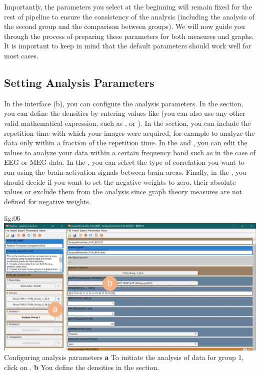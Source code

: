 \documentclass[justified]{tufte-handout}
\begin{document}
Importantly, the parameters you select at the beginning will remain fixed for the rest of pipeline to ensure the consistency of the analysis (including the analysis of the second group and the comparison between groups). We will now guide you through the process of preparing these parameters for both measures and graphs. It is important to keep in mind that the default parameters should work well for most cases.

\subsection{Setting Analysis Parameters}

In the  interface (b), you can configure the analysis parameters.
In the  section, you can define the densities by entering values like  (you can also use any other valid mathematical expression, such as , or ).
In the  section, you can include the repetition time with which your images were acquired, for example to analyze the data only within a fraction of the repetition time.
In the  and , you can edit the values to analyze your data within a certain frequency band such as in the case of EEG or MEG data.
In the , you can select the type of correlation you want to run using the brain activation signals between brain areas. 
Finally, in the , you should decide if you want to set the negative weights to zero, their absolute values or exclude them from the analysis since graph theory measures are not defined for negative weights.

	{fig:06}
	{
	\includegraphics{fig06.jpg}
	}
	{Configuring analysis parameters}
	{
	{\bf a} To initiate the analysis of data for group 1, click on .
	{\bf b} You define the densities in the  section.
	}
\end{document}
